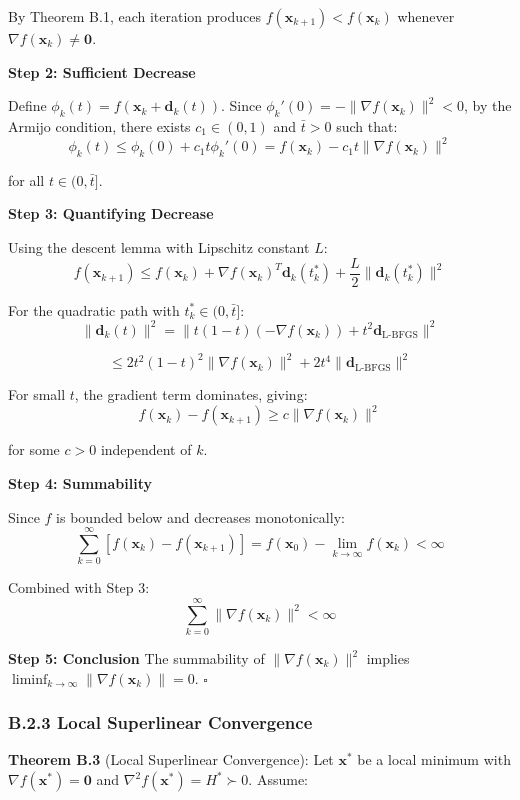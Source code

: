 By Theorem B.1, each iteration produces \(f(\mathbf{x}_{k+1}) < f(\mathbf{x}_k)\) whenever \(\nabla f(\mathbf{x}_k) \neq \mathbf{0}\).

\textbf{Step 2: Sufficient Decrease}

Define \(\phi_k(t) = f(\mathbf{x}_k + \mathbf{d}_k(t))\). Since \(\phi_k'(0) = -\|\nabla f(\mathbf{x}_k)\|^2 < 0\), by the Armijo condition, there exists \(c_1 \in (0, 1)\) and \(\bar{t} > 0\) such that:
\[\phi_k(t) \leq \phi_k(0) + c_1 t \phi_k'(0) = f(\mathbf{x}_k) - c_1 t \|\nabla f(\mathbf{x}_k)\|^2\]

for all \(t \in (0, \bar{t}]\).

\textbf{Step 3: Quantifying Decrease}

Using the descent lemma with Lipschitz constant \(L\):
\[f(\mathbf{x}_{k+1}) \leq f(\mathbf{x}_k) + \nabla f(\mathbf{x}_k)^T \mathbf{d}_k(t_k^*) + \frac{L}{2}\|\mathbf{d}_k(t_k^*)\|^2\]

For the quadratic path with \(t_k^* \in (0, \bar{t}]\):
\[\|\mathbf{d}_k(t)\|^2 = \|t(1-t)(-\nabla f(\mathbf{x}_k)) + t^2\mathbf{d}_{\text{L-BFGS}}\|^2\]

\[\leq 2t^2(1-t)^2\|\nabla f(\mathbf{x}_k)\|^2 + 2t^4\|\mathbf{d}_{\text{L-BFGS}}\|^2\]

For small \(t\), the gradient term dominates, giving:
\[f(\mathbf{x}_k) - f(\mathbf{x}_{k+1}) \geq c\|\nabla f(\mathbf{x}_k)\|^2\]

for some \(c > 0\) independent of \(k\).

\textbf{Step 4: Summability}

Since \(f\) is bounded below and decreases monotonically:
\[\sum_{k=0}^{\infty} [f(\mathbf{x}_k) - f(\mathbf{x}_{k+1})] = f(\mathbf{x}_0) - \lim_{k \to \infty} f(\mathbf{x}_k) < \infty\]

Combined with Step 3:
\[\sum_{k=0}^{\infty} \|\nabla f(\mathbf{x}_k)\|^2 < \infty\]

\textbf{Step 5: Conclusion}
The summability of \(\|\nabla f(\mathbf{x}_k)\|^2\) implies \(\liminf_{k \to \infty} \|\nabla f(\mathbf{x}_k)\| = 0\). \(\square\)

\hypertarget{b.2.3-local-superlinear-convergence}{%
\subsubsection{B.2.3 Local Superlinear Convergence}\label{b.2.3-local-superlinear-convergence}}

\textbf{Theorem B.3} (Local Superlinear Convergence): Let \(\mathbf{x}^*\) be a local minimum with \(\nabla f(\mathbf{x}^*) = \mathbf{0}\) and \(\nabla^2 f(\mathbf{x}^*) = H^* \succ 0\). Assume:

